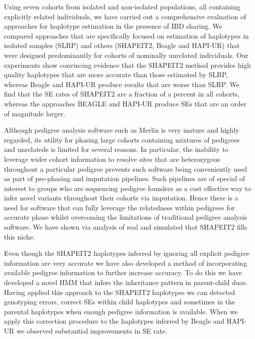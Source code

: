 Using seven cohorts from isolated and non-isolated populations, all containing explicitly related individuals, we have carried out a comprehensive evaluation of approaches for haplotype estimation in the presence of IBD sharing. We compared approaches that are specifically focused on estimation of haplotypes in isolated samples (SLRP) and others (SHAPEIT2, Beagle and HAPI-UR) that were designed predominantly for cohorts of nominally unrelated individuals. Our experiments show convincing evidence that the SHAPEIT2 method provides high quality haplotypes that are more accurate than those estimated by SLRP, whereas Beagle and HAPI-UR produce results that are worse than SLRP. We find that the SE rates of SHAPEIT2 are a fraction of a percent in all cohorts, whereas the approaches BEAGLE and HAPI-UR produce SEs that are an order of magnitude larger. 

Although pedigree analysis software such as Merlin is very mature and highly regarded, its utility for phasing large cohorts containing mixtures of pedigrees and unrelateds is limited for several reasons. In particular, the inability to leverage wider cohort information to resolve sites that are heterozygous throughout a particular pedigree  prevents such software being conveniently used as part of pre-phasing and imputation pipelines.  Such pipelines are of special of interest to  groups who are sequencing pedigree founders as a cost effective way to infer novel variants throughout their cohorts via imputation.  Hence there is a need for  software that can fully leverage the relatedness within pedigrees for accurate phase whilst overcoming the limitations of traditional pedigree analysis software.  We have shown via analysis of real and simulated that SHAPEIT2 fills this niche.

Even though the SHAPEIT2 haplotypes inferred by ignoring all explicit pedigree information are very accurate we have also developed a method of incorporating available pedigree information to further increase accuracy. To do this we have developed a novel HMM that infers the inheritance pattern in parent-child duos. Having applied this approach to the SHAPEIT2 haplotypes we can detected genotyping errors, correct SEs within child haplotypes and sometimes in the parental haplotypes when enough pedigree information is available. When we apply this correction procedure to the haplotypes inferred by Beagle and HAPI-UR we observed substantial improvements in SE rate.

